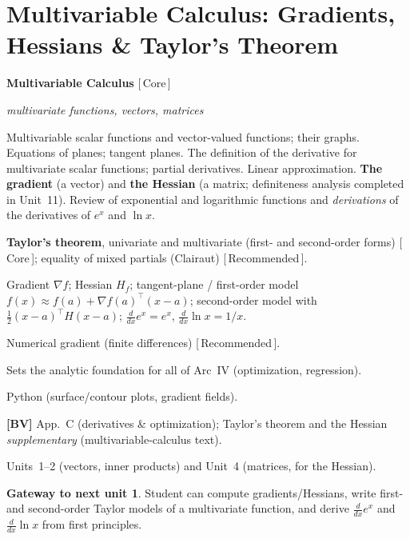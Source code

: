 \documentclass[11pt]{article}
\newcommand{\dom}[1]{{\sffamily\bfseries\color{RoyalBlue}#1}}
\newcommand{\pri}[1]{{\footnotesize\sffamily\color{BrickRed}[\,#1\,]}}
\newcommand{\obj}[1]{{\itshape #1}}
\newenvironment{unitfields}
  {\begin{description}[leftmargin=0pt,labelindent=0pt,style=nextline,
      font=\normalfont\sffamily\bfseries\color{RoyalBlue},itemsep=3pt,topsep=4pt]}
  {\end{description}}
\newcommand{\ff}[1]{\item[#1]}
\theoremstyle{definition}
\newtheorem*{gateway}{Gateway to next unit}
\begin{document}
\section{Multivariable Calculus: Gradients, Hessians \& Taylor's Theorem}
\begin{unitfields}
\ff{Domain(s)} \dom{Multivariable Calculus} \pri{Core}
\ff{Primary object(s)} \obj{multivariate functions, vectors, matrices}
\ff{Topics}
  Multivariable scalar functions and vector-valued functions; their graphs.
  Equations of planes; tangent planes. The definition of the derivative for
  multivariate scalar functions; partial derivatives. Linear approximation.
  \textbf{The gradient} (a vector) and \textbf{the Hessian} (a matrix;
  definiteness analysis completed in Unit~11). Review of exponential and
  logarithmic functions and \emph{derivations} of the derivatives of $e^x$ and
  $\ln x$.
\ff{Key theorems}
  \textbf{Taylor's theorem}, univariate and multivariate (first- and
  second-order forms) \pri{Core}; equality of mixed partials (Clairaut)
  \pri{Recommended}.
\ff{Tools / formulas}
  Gradient $\nabla f$; Hessian $H_f$; tangent-plane / first-order model
  $f(x)\approx f(a)+\nabla f(a)^\top(x-a)$; second-order model with
  $\tfrac12(x-a)^\top H(x-a)$; $\frac{d}{dx}e^x=e^x$,
  $\frac{d}{dx}\ln x=1/x$.
\ff{Algorithms}
  Numerical gradient (finite differences) \pri{Recommended}.
\ff{Applications}
  Sets the analytic foundation for all of Arc~IV (optimization, regression).
\ff{Languages}
  Python (surface/contour plots, gradient fields).
\ff{Textbook refs}
  \textbf{[BV]} App.~C (derivatives \& optimization);
  Taylor's theorem and the Hessian \emph{supplementary}
  (multivariable-calculus text).
\ff{ENTER} Units~1--2 (vectors, inner products) and Unit~4 (matrices, for the Hessian).
\end{unitfields}
\begin{gateway}
Student can compute gradients/Hessians, write first- and second-order Taylor
models of a multivariate function, and derive $\frac{d}{dx}e^x$ and
$\frac{d}{dx}\ln x$ from first principles.
\end{gateway}

\end{document}
